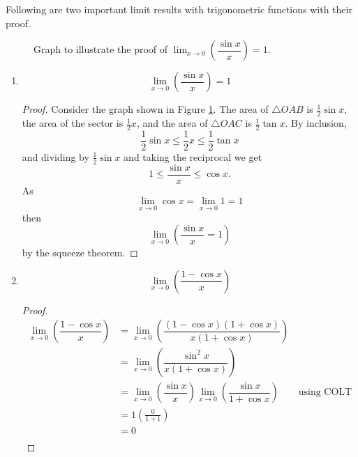 Following are two important limit results with trigonometric functions with their proof.
\begin{figure}
    \centering
    \label{fig:proof_of_trig1}
    \caption{Graph to illustrate the proof of $\lim_{x\to0}\left(\dfrac{\sin{x}}{x}\right) =1$.}
\end{figure}
        
\begin{enumerate}
    \item \[\lim_{x\to0}\left(\dfrac{\sin{x}}{x}\right)=1\]
    \begin{proof}
        Consider the graph shown in Figure \ref{fig:proof_of_trig1}. The area of $\triangle OAB$ is $\frac12\sin{x}$, the area of the sector is $\frac12x$, and the area of $\triangle OAC$ is $\frac12\tan{x}$. By inclusion, \[\frac12\sin{x}\leq\frac12x\leq\frac12\tan{x}\] and dividing by $\frac12\sin{x}$ and taking the reciprocal we get \[1\leq\dfrac{\sin{x}}x\leq\cos{x}.\] As \[\lim_{x\to0}\cos{x}=\lim_{x\to0}1=1\] then \[\lim_{x\to0}\left(\dfrac{\sin{x}}x=1\right)\] by the squeeze theorem.
    \end{proof}
    
    \item \[\lim_{x\to 0}\left(\dfrac{1-\cos{x}}{x}\right)\]
    \begin{proof}
        \begin{align*}
            \lim_{x\to 0}\left(\dfrac{1-\cos{x}}{x}\right)&=\lim_{x\to 0}\left(\dfrac{(1-\cos{x})(1+\cos{x})}{x(1+\cos{x})}\right)\\
            &=\lim_{x\to 0}\left(\dfrac{\sin^2{x}}{x(1+\cos{x})}\right)\\
            &=\lim_{x\to 0}\left(\dfrac{\sin{x}}{x}\right)\lim_{x\to 0}\left(\dfrac{\sin{x}}{1+\cos{x}}\right)\qquad\text{using COLT}\\
            &=1\left(\frac0{1+1}\right)\\
            &=0\\
        \end{align*}
    \end{proof}
\end{enumerate}

